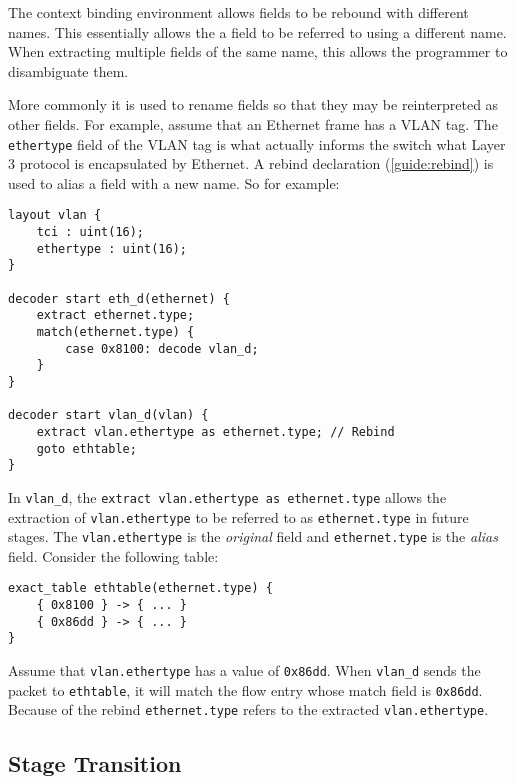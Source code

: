 The context binding environment
allows fields to be rebound with different names. This essentially
allows the a field to be referred to using a different name.
When extracting multiple fields of the same name, this allows the
programmer to disambiguate them. 

More commonly it is used to rename fields so that they may be reinterpreted as other fields. For example, assume that an Ethernet
frame has a VLAN tag. The \texttt{ethertype} field of the VLAN tag is what 
actually informs the switch what Layer 3 protocol is encapsulated
by Ethernet. 
A rebind declaration (\ref{guide:rebind}) is used to alias a field with a new name.
So for example:

\begin{codepage}
\begin{lstlisting}
layout vlan {
	tci : uint(16);
	ethertype : uint(16);
}

decoder start eth_d(ethernet) {
	extract ethernet.type;
	match(ethernet.type) {
		case 0x8100: decode vlan_d;
	}
}

decoder start vlan_d(vlan) {
	extract vlan.ethertype as ethernet.type; // Rebind
	goto ethtable;
}
\end{lstlisting}
\end{codepage}

In \texttt{vlan\_d}, the \texttt{extract vlan.ethertype as ethernet.type} allows the extraction of \texttt{vlan.ethertype} to be referred to as
\texttt{ethernet.type} in future stages. The \texttt{vlan.ethertype}
is the \emph{original} field and \texttt{ethernet.type} is the \emph{alias} field.
Consider the following table:

\begin{codepage}
\begin{lstlisting}
exact_table ethtable(ethernet.type) {
	{ 0x8100 } -> { ... }
	{ 0x86dd } -> { ... }
}
\end{lstlisting}
\end{codepage}

Assume that \texttt{vlan.ethertype} has a value of \texttt{0x86dd}.
When \texttt{vlan\_d} sends the packet to \texttt{ethtable}, it will
match the flow entry whose match field is \texttt{0x86dd}. Because of
the rebind \texttt{ethernet.type} refers to the extracted \texttt{vlan.ethertype}.


\subsection{Stage Transition} \label{tut:decoder_next}

